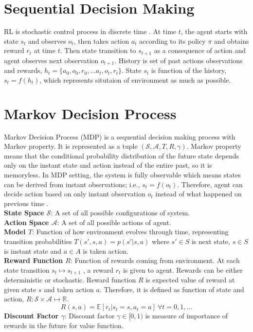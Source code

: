 \section{Sequential Decision Making}
RL is stochastic control process in discrete time \cite{sutton_reinforcement_1998}. At time $t$, the agent starts with state $s_t$ and observes $o_t$, then takes action $a_t$ according to its policy $\pi$ and obtains reward $r_t$ at time $t$. Then state transition to $s_{t+1}$ as a consequence of action and agent observes next observation $o_{t+1}$. History is set of past actions observations and rewards, $h_t=\{ a_0, o_0, r_0, ... a_t, o_t, r_t\}$. State $s_t$ is function of the history, $s_t=f(h_t)$, which represents situtaion of environment as much as possible. \\
\section{Markov Decision Process}
\label{sec:mdp}
Markov Decision Process (MDP) is a sequential decision making process with Markov property. It is represented as a tuple $(\mathcal{S},\mathcal{A},T,R,\gamma)$. Markov property means that the conditional probability distribution of the future state depends only on the instant state and action instead of the entire past, so it is memoryless. In MDP setting, the system is fully observable which means states can be derived from instant observations; i.e., $s_t=f(o_t)$. Therefore, agent can decide action based on only instant observation $o_t$ instead of what happened on previous time \cite{francois-lavet_introduction_2018}. \\
\textbf{State Space $\mathcal{S}$}: A set of all possible configurations of system. \\
\textbf{Action Space $\mathcal{A}$}: A set of all possible actions of agent. \\
\textbf{Model $T$}: Function of how environment evolves through time, representing transition probabilities $T(s',s,a) = p(s'|s,a)$ where $s' \in S$ is next state, $s \in S$ is instant state and $a \in A$ is taken action. \\
\textbf{Reward Function $R$}: Function of rewards coming from environment. At each state transition $s_t \mapsto s_{t+1}$ , a reward $r_t$ is given to agent. Rewards can be either deterministic or stochastic. Reward function $R$ is expected value of reward at given state $s$ and taken action $a$. Therefore, it is defined as function of state and action, $R \colon \mathcal{S} \times \mathcal{A} \mapsto \mathbb{R}$. \\
\begin{equation}
R(s,a) = \mathbb{E}[r_t|s_t=s, a_t=a] \: \forall t = 0,1, ...
\end{equation}
\textbf{Discount Factor $\gamma$}: Discount factor $\gamma \in [0,1)$ is measure of importance of rewards in the future for value function. \\
